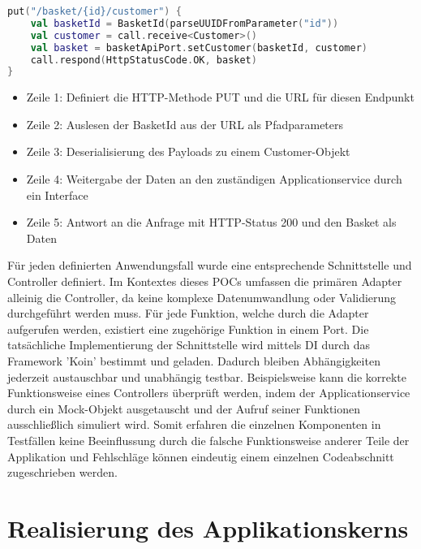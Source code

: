 \begin{minipage}{\linewidth} %
\begin{lstlisting}[caption={Beispiel eines Controllers zum aktualiseren von Kundendaten}, label={lst:controller}, language=Kotlin]
put("/basket/{id}/customer") { 
	val basketId = BasketId(parseUUIDFromParameter("id")) 
	val customer = call.receive<Customer>()  
	val basket = basketApiPort.setCustomer(basketId, customer)
	call.respond(HttpStatusCode.OK, basket)
}
\end{lstlisting}
\end{minipage}

\begin{itemize}[noitemsep,nolistsep]
	\item Zeile 1: Definiert die HTTP-Methode PUT und die URL für diesen Endpunkt
	\item Zeile 2: Auslesen der BasketId aus der URL als Pfadparameters 
	\item Zeile 3: Deserialisierung des Payloads zu einem Customer-Objekt
	\item Zeile 4: Weitergabe der Daten an den zuständigen Applicationservice durch ein Interface
	\item Zeile 5: Antwort an die Anfrage mit HTTP-Status 200 und den Basket als Daten
\end{itemize}

Für jeden definierten Anwendungsfall wurde eine entsprechende Schnittstelle und Controller definiert. Im Kontextes dieses POCs umfassen die primären Adapter alleinig die Controller, da keine komplexe Datenumwandlung oder Validierung durchgeführt werden muss. Für jede Funktion, welche durch die Adapter aufgerufen werden, existiert eine zugehörige Funktion in einem Port. Die tatsächliche Implementierung der Schnittstelle wird mittels \acrlong{DI} durch das Framework 'Koin' bestimmt und geladen. Dadurch bleiben Abhängigkeiten jederzeit austauschbar und unabhängig testbar. Beispielsweise kann die korrekte Funktionsweise eines Controllers überprüft werden, indem der Applicationservice durch ein Mock-Objekt ausgetauscht und der Aufruf seiner Funktionen ausschließlich simuliert wird. Somit erfahren die einzelnen Komponenten in Testfällen keine Beeinflussung durch die falsche Funktionsweise anderer Teile der Applikation und Fehlschläge können eindeutig einem einzelnen Codeabschnitt zugeschrieben werden.



\section{Realisierung des Applikationskerns}

